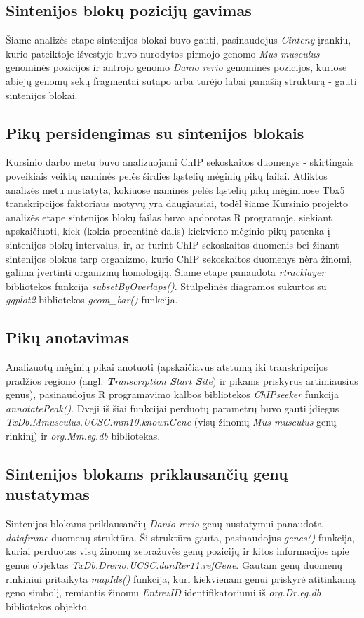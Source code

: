 \documentclass[12pt]{article}
\begin{document}
\subsection{Sintenijos blokų pozicijų gavimas}
Šiame analizės etape sintenijos blokai buvo gauti, pasinaudojus \emph{Cinteny}
įrankiu, kurio pateiktoje išvestyje buvo nurodytos pirmojo genomo
\emph{Mus musculus} genominės pozicijos ir antrojo genomo \emph{Danio rerio}
genominės pozicijos, kuriose abiejų genomų sekų fragmentai sutapo arba turėjo
labai panašią struktūrą - gauti sintenijos blokai.

\subsection{Pikų persidengimas su sintenijos blokais}
Kursinio darbo metu buvo analizuojami ChIP sekoskaitos duomenys - skirtingais
poveikiais veiktų naminės pelės širdies ląstelių mėginių pikų failai. Atliktos
analizės metu nustatyta, kokiuose naminės pelės ląstelių pikų mėginiuose Tbx5
transkripcijos faktoriaus motyvų yra daugiausiai, todėl šiame Kursinio projekto
analizės etape sintenijos blokų failas buvo apdorotas R programoje, siekiant
apskaičiuoti, kiek (kokia procentinė dalis) kiekvieno mėginio pikų patenka į
sintenijos blokų intervalus, ir, ar turint ChIP sekoskaitos duomenis bei
žinant sintenijos blokus tarp organizmo, kurio ChIP sekoskaitos duomenys nėra
žinomi, galima įvertinti organizmų homologiją. Šiame etape panaudota
\emph{rtracklayer}\cite{R_TRACK} bibliotekos funkcija \emph{subsetByOverlaps()}.
Stulpelinės diagramos sukurtos su \emph{ggplot2}\cite{R_GGPLOT} bibliotekos
\emph{geom\_bar()} funkcija.

\subsection{Pikų anotavimas}
Analizuotų mėginių pikai anotuoti (apskaičiavus atstumą iki transkripcijos
pradžios regiono (angl. \emph{\textbf{T}ranscription \textbf{S}tart
\textbf{S}ite}) ir pikams priskyrus artimiausius genus), pasinaudojus R
programavimo kalbos bibliotekos \emph{ChIPseeker}\cite{CHIP} funkcija
\emph{annotatePeak()}. Dveji iš šiai funkcijai perduotų parametrų buvo gauti
įdiegus \emph{TxDb.Mmusculus.UCSC.mm10.knownGene}\cite{KNOWN_GENE} (visų žinomų
\emph{Mus musculus} genų rinkinį) ir \emph{org.Mm.eg.db}\cite{MM_ANNOT}
bibliotekas.

\subsection{Sintenijos blokams priklausančių genų nustatymas}
Sintenijos blokams priklausančių \emph{Danio rerio} genų nustatymui panaudota
\emph{dataframe} duomenų struktūra. Ši struktūra gauta, pasinaudojus
\emph{genes()} funkcija, kuriai perduotas visų žinomų zebražuvės genų pozicijų
ir kitos informacijos apie genus objektas
\emph{TxDb.Drerio.UCSC.danRer11.\-refGene}\cite{REF_GENE}. Gautam genų duomenų
rinkiniui pritaikyta \emph{mapIds()} funkcija, kuri kiekvienam genui priskyrė
atitinkamą geno simbolį, remiantis žinomu \emph{EntrezID} identifikatoriumi iš
\emph{org.Dr.eg.db}\cite{DR_ANNOT} bibliotekos objekto.
\end{document}

